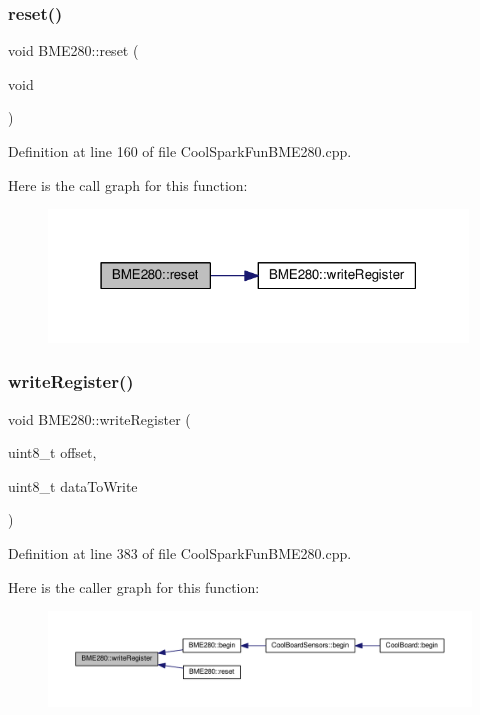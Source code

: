 \subsubsection{\texorpdfstring{reset()}{reset()}}
{\footnotesize\ttfamily void B\+M\+E280\+::reset (\begin{DoxyParamCaption}\item[{void}]{ }\end{DoxyParamCaption})}



Definition at line 160 of file Cool\+Spark\+Fun\+B\+M\+E280.\+cpp.

Here is the call graph for this function\+:\nopagebreak
\begin{figure}[H]
\begin{center}
\leavevmode
\includegraphics[width=316pt]{class_b_m_e280_aeec5deb6daace6ae390108b4210e9df7_cgraph}
\end{center}
\end{figure}
\mbox{\label{class_b_m_e280_afcff21c342725246bf415d7f0e4d04f0}} 
\subsubsection{\texorpdfstring{write\+Register()}{writeRegister()}}
{\footnotesize\ttfamily void B\+M\+E280\+::write\+Register (\begin{DoxyParamCaption}\item[{uint8\+\_\+t}]{offset,  }\item[{uint8\+\_\+t}]{data\+To\+Write }\end{DoxyParamCaption})}



Definition at line 383 of file Cool\+Spark\+Fun\+B\+M\+E280.\+cpp.

Here is the caller graph for this function\+:\nopagebreak
\begin{figure}[H]
\begin{center}
\leavevmode
\includegraphics[width=350pt]{class_b_m_e280_afcff21c342725246bf415d7f0e4d04f0_icgraph}
\end{center}
\end{figure}


